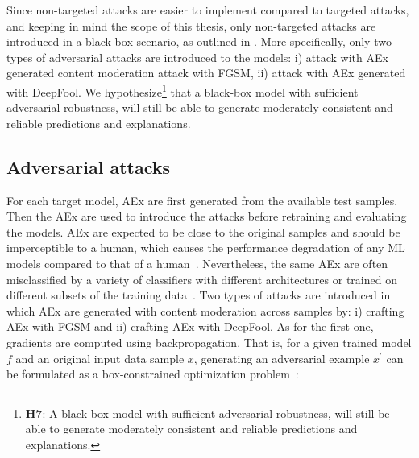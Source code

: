 \hspace*{3.5mm} Since non-targeted attacks are easier to implement compared to targeted attacks, and keeping in mind the scope of this thesis, only non-targeted attacks are introduced in a black-box scenario, as outlined in . More specifically, only two types of adversarial attacks are introduced to the models: i) attack with AEx generated content moderation attack with FGSM, ii) attack with AEx generated with DeepFool. %
We hypothesize\footnote{\textbf{H7}: A black-box model with sufficient adversarial robustness, will still be able to generate moderately consistent and reliable predictions and explanations. } that a black-box model with sufficient adversarial robustness, will still be able to generate moderately consistent and reliable predictions and explanations. 

\subsection{Adversarial attacks}
For each target model, AEx are first generated from the available test samples. Then the AEx are used to introduce the attacks before retraining and evaluating the models. %
AEx are expected to be close to the original samples and should be imperceptible to a human, which causes the performance degradation of any ML models compared to that of a human~\cite{goodfellow2014explaining}. Nevertheless, the same AEx are often misclassified by a variety of classifiers with different architectures or trained on different subsets of the training data~\cite{yuan2019adversarial,goodfellow2014explaining}.
Two types of attacks are introduced in which AEx are generated with content moderation across samples by: i) crafting AEx with FGSM and ii) crafting AEx with DeepFool.
As for the first one, gradients are computed using backpropagation. That is, for a given trained model $f$ and an original input data sample $x$, generating an adversarial example $x^{\prime}$ can be formulated as a box-constrained optimization problem~\cite{yuan2019adversarial}:

